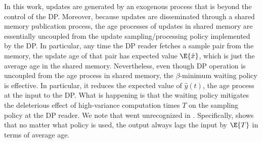 \documentclass[conference, 10pt]{IEEEtran}
\newcommand{\maxage}{\hat{x}}
\newcommand{\dpage}{\hat{y}}
\begin{document}
In this work, updates are generated by an exogenous process that is beyond the control of the DP. Moreover, because updates are disseminated through a shared memory publication process, the  age processes of updates in shared memory are essentially uncoupled from the update sampling/processing policy implemented by the DP. In particular, any time the DP reader fetches a sample pair from the memory, the update age of that pair has expected value $\E{\maxage}$, which is just the average age in the shared memory. Nevertheless, even though  DP operation is uncoupled from the age process in shared memory, the $\beta$-minimum waiting policy is effective. In particular, it reduces the expected value of $\dpage(t)$, the age process at the input to the DP. What is happening is that the waiting policy mitigates the deleterious effect of high-variance computation times $T$ on the sampling policy at the DP reader.
We note that  went unrecognized in \cite{Sun-UBYKS-IT2017UpdateorWait,Yates-isit2015}. Specifically,  shows that no matter what policy is used, the output always lags the input by $\E{T}$ in terms of average age.

\end{document}
